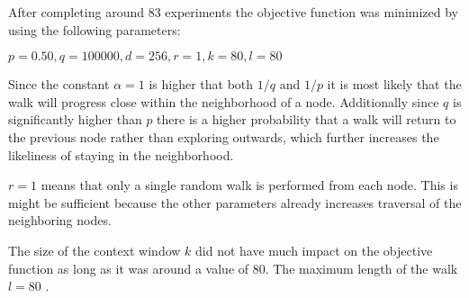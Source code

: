 After completing around 83 experiments the objective function was minimized by using the following parameters:

$p=0.50, q=100000, d=256, r=1, k=80, l=80$

Since the constant $\alpha = 1$ is higher that both $1/q$ and $1/p$ it is most likely that the walk will progress close within the neighborhood of a node. Additionally since $q$ is significantly higher than $p$ there is a higher probability that a walk will return to the previous node rather than exploring outwards, which further increases the likeliness of staying in the neighborhood.

$r=1$ means that only a single random walk is performed from each node. This is might be sufficient because the other parameters already increases traversal of the neighboring nodes.

The size of the context window $k$ did not have much impact on the objective function as long as it was around a value of 80. The maximum length of the walk $l=80$ .


